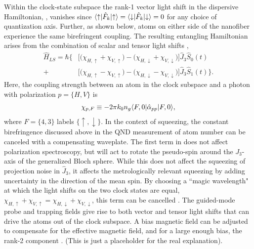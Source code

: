 \documentclass[preprint,aps,pra,onecolumn]{revtex4-1} %
\newcommand{\change}[1]{{\color{RoyalBlue} #1}}
\newcommand{\comment}[1]{{\color{Maroon} #1}}
\newcommand{\error}[1]{{\color{red} #1}}
\begin{document}
Within the clock-state subspace the rank-1 vector light shift in the dispersive Hamiltonian, , vanishes since $\langle{\uparrow}\rvert \hat{F}_k \lvert{\uparrow}\rangle =\langle{\downarrow}\rvert \hat{F}_k \lvert{\downarrow}\rangle = 0$ for any choice of quantization axis. Further, as shown below, atoms on either side of the nanofiber experience the same birefringent coupling. The resulting entangling Hamiltonian arises from the combination of scalar and tensor light shifts \cite{chaudhury_continuous_2006},
	\begin{align} \label{Eq::ClockHamiltonian}
		\hat{H}_{LS} = \hbar \Big\{ %
		 & \big[ \big( \chi_{H,\uparrow} +\chi_{V,\uparrow} \big) - \big( \chi_{H,\downarrow} + \chi_{V,\downarrow}\big) \big] \hat{J}_3 \hat{S}_0(t) \\
		+ & \big[  \big( \chi_{H, \uparrow} - \chi_{V,\uparrow} \big) - \big(\chi_{H,\downarrow} - \chi_{V,\downarrow} \big) \big]  \hat{J}_3 \hat{S}_1(t) \Big\}. \nonumber
	\end{align}
Here, the coupling strength between an atom in the clock subspace and a photon with polarization $p = \{H,V\}$ is
	\begin{equation} \label{Eq::ClockCouplingStrength}
		\chi_{p,F} \equiv - 2\pi k_0 n_g  \langle{F,0}\rvert\hat{\alpha}_{pp}  \lvert{F,0}\rangle,
	\end{equation}
where $F = \{4,3\}$ labels $\{\uparrow,\downarrow\}$. In the context of squeezing, the constant birefringence discussed above in the QND measurement of atom number can be canceled with a compensating waveplate. The first term in  does not affect polarization spectroscopy, but will act to rotate the pseudo-spin around the $J_3$-axis of the generalized Bloch sphere.  While this does not affect the squeezing of projection noise in $\hat{J}_3$, it affects the metrologically relevant squeezing by adding uncertainty in the direction of the mean spin.  By choosing a ``magic wavelength" at which the light shifts on the two clock states are equal, $\chi_{H,\uparrow} +\chi_{V,\uparrow}  = \chi_{H,\downarrow} + \chi_{V,\downarrow}$, this term can be cancelled \cite{chaudhury_continuous_2006}. \change{The guided-mode probe and trapping fields give rise to both vector and tensor light shifts that can drive the atoms out of the clock subspace. A bias magnetic field can be adjusted to compensate for the effective magnetic field, and for a large enough bias, the rank-2 component \cite{smith_continuous_2004}.} \comment{(This is just a placeholder for the real explanation). } 
\end{document}
